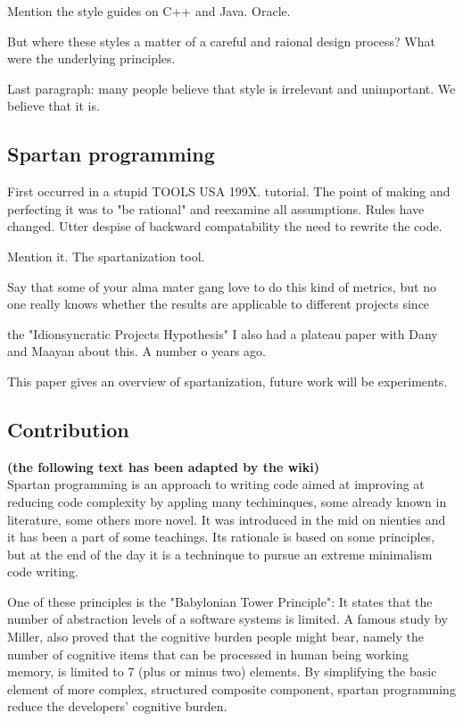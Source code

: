 Mention the style guides on C++ and Java. Oracle.

But where these styles a matter of a careful and raional design process?
What were the underlying principles.

Last paragraph: many people believe that style is irrelevant and unimportant. 
We believe that it is.

\subsection{Spartan programming}
First occurred in a stupid TOOLS USA 199X. tutorial.
The point of making and perfecting it was to "be rational" and 
reexamine all assumptions. 
Rules have changed.
Utter despise of backward compatability the need to rewrite the code.

Mention it.  The spartanization tool.

Say that some of your alma mater gang love to do this kind of metrics, but 
no one really knows whether the results are applicable to different projects
since 
\cite{Turnu:Concas:Marchesi:Tonelli:11}


the "Idionsyncratic Projects Hypothesis" I also had a plateau paper with 
Dany and Maayan about this. A number o years ago.


This paper gives an overview of spartanization, future work will be
experiments.

\subsection{Contribution}

\textbf{(the following text has been adapted by the wiki)}\\

Spartan programming is an approach to writing code aimed at improving at
reducing code complexity by appling many techininques, some already known in
literature, some others more novel. It was introduced in the mid on nienties
and it has been a part of some teachings.  Its rationale is based on some
principles, but at the end of the day it is a techninque to pursue an extreme
minimalism code writing.

One of these principles is the "Babylonian Tower Principle": It states that the
number of abstraction levels of a software systems is limited.  A famous study
by Miller, also proved that the cognitive burden people might bear, namely the
number of cognitive items that can be processed in human being working memory,
is limited to 7 (plus or minus two) elements. By simplifying the basic element
of more complex, structured composite component, spartan programming reduce the
developers' cognitive burden.

